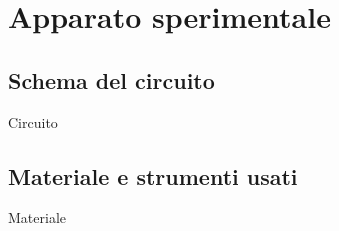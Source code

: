 \section{Apparato sperimentale}\label{sec:apparato-sperimentale}
  \subsection{Schema del circuito}\label{subsec:schema-circuito}
    Circuito
  \subsection{Materiale e strumenti usati}\label{subsec:materiali}
    Materiale
